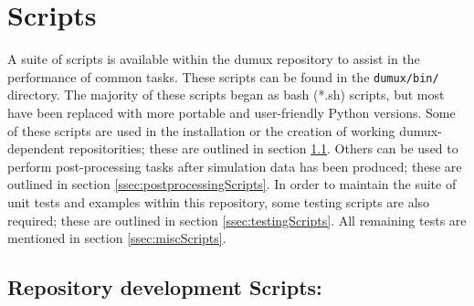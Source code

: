 
\section{Scripts}
\label{sc_scripts}

A suite of scripts is available within the dumux repository to assist in the performance of common tasks. These scripts can be found in the \texttt{dumux/bin/} directory. 
The majority of these scripts began as bash (*.sh) scripts, but most have been replaced with more portable and user-friendly Python versions. 
Some of these scripts are used in the installation or the creation of working dumux-dependent repositorities; these are outlined in section \ref{ssec:repoDevScripts}.
Others can be used to perform post-processing tasks after simulation data has been produced; these are outlined in section \ref{ssec:postprocessingScripts}. In order to maintain the suite of unit tests and examples within this repository, some testing scripts are also required; these are outlined in section \ref{ssec:testingScripts}. All remaining tests are mentioned in section \ref{ssec:miscScripts}.

\subsection{Repository development Scripts:} \label{ssec:repoDevScripts}

